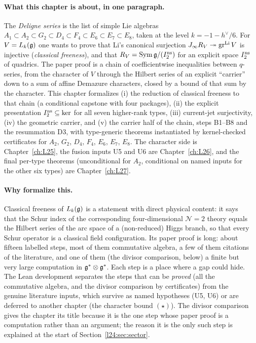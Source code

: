\paragraph{What this chapter is about, in one paragraph.} The \emph{Deligne series} is the list of
simple Lie algebras $A_1\subset A_2\subset G_2\subset D_4\subset F_4\subset E_6\subset E_7\subset E_8$,
taken at the level $k=-1-h^\vee/6$. For $V=L_k(\mathfrak g)$ one wants to prove that Li's canonical
surjection $J_\infty R_V\twoheadrightarrow\operatorname{gr}^{\mathrm{Li}} V$ is injective (\emph{classical freeness}), and that
$R_V=\operatorname{Sym}\mathfrak g/(I_2^{\mathrm{ns}})$ for an explicit space $I_2^{\mathrm{ns}}$ of
quadrics. The paper proof is a chain of coefficientwise inequalities between $q$-series, from the
character of $V$ through the Hilbert series of an explicit ``carrier'' down to a sum of affine Demazure
characters, closed by a bound of that sum by the character. This chapter formalizes (i) the reduction of classical
freeness to that chain (a conditional capstone with four packages), (ii) the explicit presentation
$I_2^{\mathrm{ns}}\subseteq\ker$ for all seven higher-rank types, (iii) current-jet surjectivity, (iv)
the geometric carrier, and (v) the carrier half of the chain, steps B1--B8 and the resummation D3, with
type-generic theorems instantiated by kernel-checked certificates for $A_2$, $G_2$, $D_4$, $F_4$,
$E_6$, $E_7$, $E_8$. The character side is Chapter~\ref{ch:L25}, the fusion inputs U5 and U6 are
Chapter~\ref{ch:L26}, and the final per-type theorems (unconditional for $A_2$, conditional on named inputs for the other six types) are
Chapter~\ref{ch:L27}.

\paragraph{Why formalize this.} Classical freeness of $L_k(\mathfrak g)$ is a statement with direct physical
content: it says that the Schur index of the corresponding four-dimensional $\mathcal N=2$ theory equals the Hilbert
series of the arc space of a (non-reduced) Higgs branch, so that every Schur operator is a classical field
configuration. Its paper proof is long: about fifteen labelled steps, most of them commutative algebra, a few of
them citations of the literature, and one of them (the divisor comparison, below) a finite but very large
computation in $\mathfrak g^*\otimes\mathfrak g^*$. Each step is a place where a gap could hide. The Lean
development separates the steps that can be \emph{proved} (all the commutative algebra, and the divisor comparison
by certificates) from the genuine literature inputs, which survive as named hypotheses (U5, U6) or are deferred to
another chapter (the character bound $(\star)$). The divisor comparison gives the chapter its title because it is the
one step whose paper proof is a computation rather than an argument; the reason it is the only such step is explained
at the start of Section~\ref{l24:sec:sector}.

